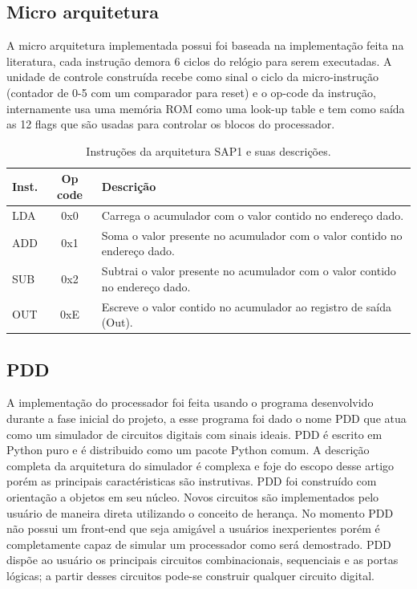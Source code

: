 \documentclass[11pt, twocolumn]{article}
\begin{document}
\subsection{Micro arquitetura}
A micro arquitetura implementada possui foi baseada na implementação feita na literatura, cada instrução demora 6 ciclos do relógio para serem executadas. A unidade de controle construída recebe como sinal o ciclo da micro-instrução (contador de 0-5 com um comparador para reset) e o op-code da instrução, internamente usa uma memória ROM como uma look-up table e tem como saída as 12 flags que são usadas para controlar os blocos do processador.

\begin{table}
  \caption{Instruções da arquitetura SAP1 e suas descrições.}
\begin{tabular*}{\linewidth}{lcp{6cm}}
  \hline
 Inst. & Op code & Descrição \\
 \hline
 LDA         &     0x0 & Carrega o acumulador com o valor contido no endereço dado. \\
 ADD         &     0x1 & Soma o valor presente no acumulador com o valor contido no endereço dado. \\
 SUB         &     0x2 & Subtrai o valor presente no acumulador com o valor contido no endereço dado.\\
 OUT         &     0xE & Escreve o valor contido no acumulador ao registro de saída (Out). \\ 
 \hline
\end{tabular*}
\label{tab-inst}
\end{table}


\subsection{PDD}
A implementação do processador foi feita usando o programa desenvolvido durante a fase inicial do projeto, a esse programa foi dado o nome PDD que atua como um simulador de circuitos digitais com sinais ideais. PDD é escrito em Python puro e é distribuido como um pacote Python comum. A descrição completa da arquitetura do simulador é complexa e foje do escopo desse artigo porém as principais caractéristicas são instrutivas. PDD foi construído com orientação a objetos em seu núcleo. Novos circuitos são implementados pelo usuário de maneira direta utilizando o conceito de herança. No momento PDD não possui um front-end que seja amigável a usuários inexperientes porém é completamente capaz de simular um processador como será demostrado. PDD dispõe ao usuário os principais circuitos combinacionais, sequenciais e as portas lógicas; a partir desses circuitos pode-se construir qualquer circuito digital.
\end{document}
